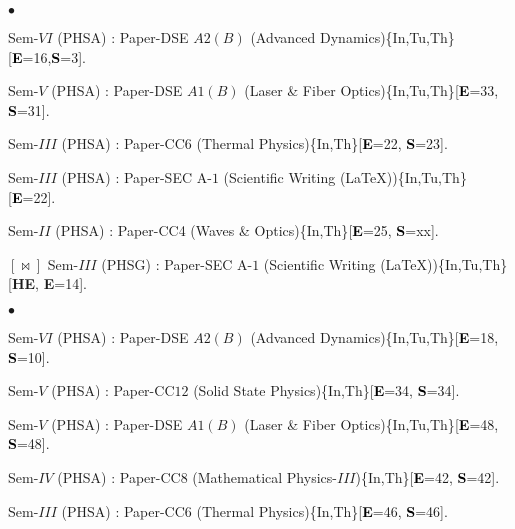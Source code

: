 \documentclass[margin,line]{res}
\newenvironment{list1}{
  \begin{list}{\ding{113}}{%
      \setlength{\itemsep}{0in}
      \setlength{\parsep}{0in} \setlength{\parskip}{0in}
      \setlength{\topsep}{0in} \setlength{\partopsep}{0in} 
      \setlength{\leftmargin}{0.17in}}}{\end{list}}
\newenvironment{list2}{
  \begin{list}{$\bullet$}{%
      \setlength{\itemsep}{0in}
      \setlength{\parsep}{0in} \setlength{\parskip}{0in}
      \setlength{\topsep}{0in} \setlength{\partopsep}{0in} 
      \setlength{\leftmargin}{0.2in}}}{\end{list}}
\begin{document}
\begin{resume}
\begin{list1}
\item[] \textcolor{iris}{}
\vspace{1mm}
\end{list1}
\begin{list2}
\item Sem-$VI$ (PHSA) : Paper-DSE $A2(B)$ (Advanced Dynamics)\textcolor{alizarin}{\{In,Tu,Th\}}[\textcolor{black}{\bf E}=16,\textcolor{black}{\bf S}=3].
\item Sem-$V$ (PHSA) : Paper-DSE $A1(B)$ (Laser \& Fiber Optics)\textcolor{alizarin}{\{In,Tu,Th\}}[\textcolor{black}{\bf E}=33, 
      \textcolor{black}{\bf S}=31].
\item Sem-$III$ (PHSA) : Paper-CC6 (Thermal Physics)\textcolor{alizarin}{\{In,Th\}}[\textcolor{black}{\bf E}=22, \textcolor{black}{\bf S}=23]. 
\item Sem-$III$ (PHSA) : Paper-SEC A-$1$ (Scientific Writing (\LaTeX))\textcolor{alizarin}{\{In,Tu,Th\}}[\textcolor{black}{\bf E}=22]. 
\item Sem-$II$  (PHSA) : Paper-CC4 (Waves \& Optics)\textcolor{alizarin}{\{In,Th\}}[\textcolor{black}{\bf E}=25, \textcolor{black}{\bf S}=xx]. 
\item[$\pmb{[\Join]}$] Sem-$III$ (PHSG) : Paper-SEC A-$1$ (Scientific Writing (\LaTeX))\textcolor{alizarin}{\{In,Tu,Th\}}[\textcolor{asparagus}{\bf HE}, 
     {\textbf E}=14]. 
\end{list2}
\begin{list1}
\item[] \textcolor{iris}{}
\vspace{1mm}
\end{list1}
\begin{list2}
\item Sem-$VI$ (PHSA) : Paper-DSE $A2(B)$ (Advanced Dynamics)\textcolor{alizarin}{\{In,Tu,Th\}}[\textcolor{black}{\bf E}=18, 
      \textcolor{black}{\bf S}=10].
\item Sem-$V$ (PHSA) : Paper-CC$12$ (Solid State Physics)\textcolor{alizarin}{\{In,Th\}}[\textcolor{black}{\bf E}=34, \textcolor{black}{\bf S}=34]. 
\item Sem-$V$ (PHSA) : Paper-DSE $A1(B)$ (Laser \& Fiber Optics)\textcolor{alizarin}{\{In,Tu,Th\}}[\textcolor{black}{\bf E}=48, \textcolor{black}{\bf S}=48]. 
\item Sem-$IV$ (PHSA) : Paper-CC8 (Mathematical Physics-$III$)\textcolor{alizarin}{\{In,Th\}}[\textcolor{black}{\bf E}=42, \textcolor{black}{\bf S}=42]. 
\item Sem-$III$ (PHSA) : Paper-CC6 (Thermal Physics)\textcolor{alizarin}{\{In,Th\}}[\textcolor{black}{\bf E}=46, \textcolor{black}{\bf S}=46]. 

\end{list2}
\end{resume}
\end{document}

